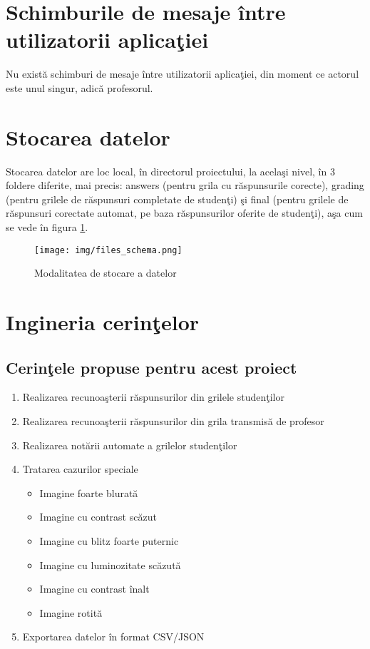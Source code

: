 \documentclass{report}
\begin{document}
\section{Schimburile de mesaje între utilizatorii aplica\c tiei}

Nu exist\u a schimburi de mesaje între utilizatorii aplica\c tiei, din moment ce actorul este unul singur, adic\u a profesorul.

\section{Stocarea datelor}

Stocarea datelor are loc local, în directorul proiectului, la acela\c si nivel, în 3 foldere diferite, mai precis: answers (pentru grila cu r\u aspunsurile corecte), grading (pentru grilele de r\u aspunsuri completate de studen\c ti) \c si final (pentru grilele de r\u aspunsuri corectate automat, pe baza r\u aspunsurilor oferite de studen\c ti), a\c sa cum se vede în figura \ref{datafolders}.




\begin{figure}[h!]
    \centering
    \texttt{[image: img/files\_schema.png]}
    \caption{Modalitatea de stocare a datelor}
    \label{datafolders}
\end{figure}



\newpage 

\section{Ingineria cerin\c telor}
\subsection{Cerin\c tele propuse pentru acest proiect}

\begin{enumerate}
    \item Realizarea recunoa\c sterii r\u aspunsurilor din grilele studen\c tilor
    \item Realizarea recunoa\c sterii r\u aspunsurilor din grila transmis\u a de profesor
    \item Realizarea not\u arii automate a grilelor studen\c tilor
    \item Tratarea cazurilor speciale
    \begin{itemize}
        \item Imagine foarte blurat\u a
       \item Imagine cu contrast sc\u azut
       \item Imagine cu blitz foarte puternic
     \item   Imagine cu luminozitate sc\u azut\u a
     \item   Imagine cu contrast înalt
     \item   Imagine rotit\u a
    \end{itemize}
    \item Exportarea datelor în format CSV/JSON
\end{enumerate}
\end{document}
